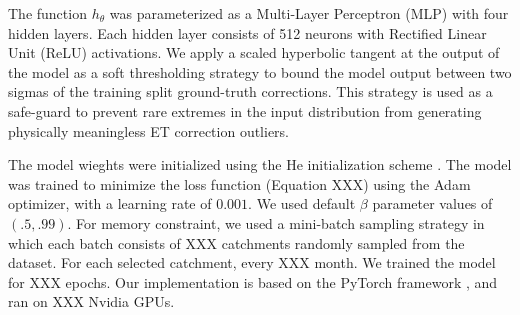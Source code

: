 \documentclass[draft]{agujournal2019}
\begin{document}
The function $h_\theta$ was parameterized as a Multi-Layer Perceptron (MLP) with four hidden layers.
Each hidden layer consists of 512 neurons with Rectified Linear Unit (ReLU) activations.
We apply a scaled hyperbolic tangent at the output of the model as a soft thresholding strategy 
to bound the model output between two sigmas of the training split ground-truth corrections.
This strategy is used as a safe-guard to prevent rare extremes in the input distribution from 
generating physically meaningless ET correction outliers.
  
The model wieghts were initialized using the He initialization scheme \cite{XXX}.
The model was trained to minimize the loss function (Equation XXX) 
using the Adam optimizer, with a learning rate of $0.001$.
We used default $\beta$ parameter values of $(.5, .99)$.
For memory constraint, we used a mini-batch sampling strategy in which each batch consists of
XXX catchments randomly sampled from the dataset. 
For each selected catchment, every XXX month.
We trained the model for XXX epochs.
Our implementation is based on the PyTorch framework \cite{XXX}, and ran on XXX Nvidia GPUs. 
\end{document}
